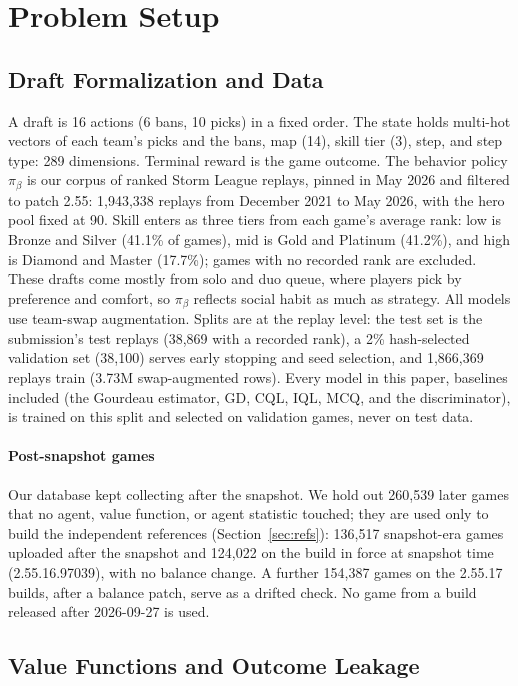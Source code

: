 \documentclass[journal]{IEEEtran}
\begin{document}
\section{Problem Setup}
\label{sec:setup}

\subsection{Draft Formalization and Data}

A draft is 16 actions (6 bans, 10 picks) in a fixed order. The state holds multi-hot vectors of each team's picks and the bans, map (14), skill tier (3), step, and step type: 289 dimensions. Terminal reward is the game outcome. The behavior policy $\pi_\beta$ is our corpus of ranked Storm League replays, pinned in May 2026 and filtered to patch 2.55: 1,943,338 replays from December 2021 to May 2026, with the hero pool fixed at 90. Skill enters as three tiers from each game's average rank: low is Bronze and Silver (41.1\% of games), mid is Gold and Platinum (41.2\%), and high is Diamond and Master (17.7\%); games with no recorded rank are excluded. These drafts come mostly from solo and duo queue, where players pick by preference and comfort, so $\pi_\beta$ reflects social habit as much as strategy. All models use team-swap augmentation. Splits are at the replay level: the test set is the submission's test replays (38,869 with a recorded rank), a 2\% hash-selected validation set (38,100) serves early stopping and seed selection, and 1,866,369 replays train (3.73M swap-augmented rows). Every model in this paper, baselines included (the Gourdeau estimator, GD, CQL, IQL, MCQ, and the discriminator), is trained on this split and selected on validation games, never on test data.

\paragraph{Post-snapshot games} Our database kept collecting after the snapshot. We hold out 260,539 later games that no agent, value function, or agent statistic touched; they are used only to build the independent references (Section~\ref{sec:refs}): 136,517 snapshot-era games uploaded after the snapshot and 124,022 on the build in force at snapshot time (2.55.16.97039), with no balance change. A further 154,387 games on the 2.55.17 builds, after a balance patch, serve as a drifted check. No game from a build released after 2026-09-27 is used.

\subsection{Value Functions and Outcome Leakage}
\label{sec:leak}
\end{document}
